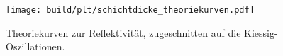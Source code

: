 \begin{figure}
    \centering
    \texttt{[image: build/plt/schichtdicke\_theoriekurven.pdf]}
    \caption{
        Theoriekurven zur Reflektivität,
        zugeschnitten auf die Kiessig-Oszillationen.
    }
    \label{fig:plt:schichtdicke_c}
\end{figure}
